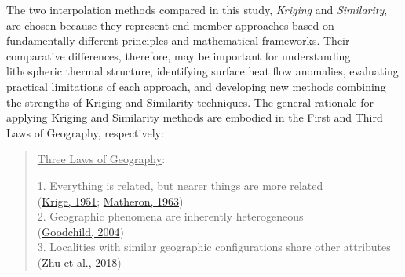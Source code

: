 The two interpolation methods compared in this study, \emph{Kriging} and \emph{Similarity}, are chosen because they represent end-member approaches based on fundamentally different principles and mathematical frameworks. Their comparative differences, therefore, may be important for understanding lithospheric thermal structure, identifying surface heat flow anomalies, evaluating practical limitations of each approach, and developing new methods combining the strengths of Kriging and Similarity techniques. The general rationale for applying Kriging and Similarity methods are embodied in the First and Third Laws of Geography, respectively:

\pagebreak

\begin{quote}
\uline{Three Laws of Geography}:

1. Everything is related, but nearer things are more related\\
\hspace*{0.333em}\hspace*{0.333em}\hspace*{0.333em}(\protect\hyperlink{ref-krige1951}{Krige, 1951}; \protect\hyperlink{ref-matheron1963}{Matheron, 1963})\\
2. Geographic phenomena are inherently heterogeneous\\
\hspace*{0.333em}\hspace*{0.333em}\hspace*{0.333em}(\protect\hyperlink{ref-goodchild2004}{Goodchild, 2004})\\
3. Localities with similar geographic configurations share other attributes\\
\hspace*{0.333em}\hspace*{0.333em}\hspace*{0.333em}(\protect\hyperlink{ref-zhu2018}{Zhu et al., 2018})
\end{quote}

